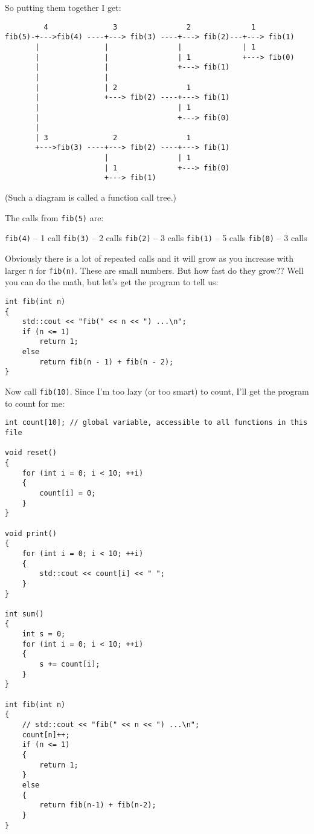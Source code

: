 So putting them together I get:

\begin{Verbatim}
         4               3                2              1
fib(5)-+--->fib(4) ----+---> fib(3) ----+---> fib(2)---+---> fib(1)
       |               |                |              | 1
       |               |                | 1            +---> fib(0)
       |               |                +---> fib(1)
       |               |
       |               | 2                1
       |               +---> fib(2) ----+---> fib(1)
       |                                | 1
       |                                +---> fib(0)
       |   
       | 3               2                1
       +--->fib(3) ----+---> fib(2) ----+---> fib(1)
                       |                | 1
                       | 1              +---> fib(0)
                       +---> fib(1)
\end{Verbatim}
(Such a diagram is called a function call tree.)


\newpage
The calls from \verb!fib(5)! are:
\begin{tightlist}
  \li \verb!fib(4)! -- 1 call
  \li \verb!fib(3)! -- 2 calls
  \li \verb!fib(2)! -- 3 calls
  \li \verb!fib(1)! -- 5 calls
  \li \verb!fib(0)! -- 3 calls
\end{tightlist}

Obviously there is a lot of repeated calls and it will grow as you increase
with larger \verb!n! for \verb!fib(n)!. These
are small numbers. But how fast do they grow?? Well you can do the math, but
let's get the program
to tell us:

\begin{Verbatim}[frame=single]
int fib(int n)
{
    std::cout << "fib(" << n << ") ...\n";
    if (n <= 1)
        return 1;
    else
        return fib(n - 1) + fib(n - 2);
}
\end{Verbatim}      

Now call \verb!fib(10)!. Since I'm too lazy (or too smart) to count, I'll get
the program to count for me:

\begin{Verbatim}[frame=single]
int count[10]; // global variable, accessible to all functions in this file

void reset()
{
    for (int i = 0; i < 10; ++i)
    {
        count[i] = 0;
    }  
}
  
void print()
{
    for (int i = 0; i < 10; ++i)
    {
        std::cout << count[i] << " ";
    }
}
  
int sum()
{
    int s = 0;
    for (int i = 0; i < 10; ++i)
    {
        s += count[i];
    }
}

int fib(int n)
{
    // std::cout << "fib(" << n << ") ...\n";
    count[n]++;
    if (n <= 1)
    {
        return 1;
    }
    else
    {
        return fib(n-1) + fib(n-2);
    }
}
\end{Verbatim}

